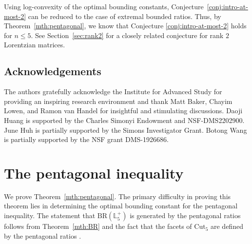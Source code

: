 \documentclass{amsart}
\theoremstyle{definition}
\newtheorem{mainconjecture}{Conjecture}
\theoremstyle{remark}
\def\L{\mathbb{L}}
\def\BR{\mathrm{BR}}
\def\Cut{\mathrm{Cut}}
\begin{document}
Using log-convexity of the optimal bounding constants, 
Conjecture~\ref{conj:intro-at-most-2} can be reduced to the case of extremal bounded ratios. Thus,
by Theorem~\ref{mth:pentagonal}, we know that Conjecture \ref{conj:intro-at-most-2} holds for $n\leq 5$.
See Section~\ref{sec:rank2} for a closely related conjecture for rank $2$ Lorentzian matrices.



\subsection*{Acknowledgements}
The authors gratefully acknowledge the Institute for Advanced Study for providing an inspiring research environment and thank Matt Baker, Chayim Lowen, and Ramon van Handel for insightful and stimulating discussions.
Daoji Huang is  supported by the Charles Simonyi Endowment and NSF-DMS2202900.
June Huh is partially supported by the Simons Investigator Grant.
 Botong Wang is partially supported by the NSF grant DMS-1926686.

 \section{The pentagonal inequality}


 
We prove Theorem~\ref{mth:pentagonal}.
The primary difficulty in proving this theorem lies in determining the optimal bounding constant for the pentagonal inequality. The statement that $\BR(\L_5^+)$ is generated by the pentagonal ratios follows from Theorem~\ref{mth:BR} and the fact that the facets of $\Cut_5$ are defined by the pentagonal ratios \cite[Section 30.6]{Deza-Laurent}.
\end{document}
